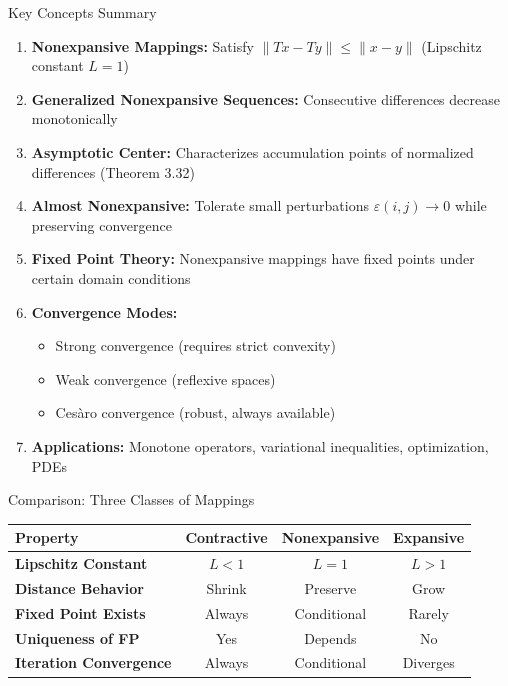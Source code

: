 \documentclass[aspectratio=169,10pt]{beamer}
\begin{document}
\begin{frame}{Key Concepts Summary}
    \begin{enumerate}
        \item \textbf{Nonexpansive Mappings:} Satisfy $\|Tx - Ty\| \leq \|x - y\|$ (Lipschitz constant $L = 1$)

        \item \textbf{Generalized Nonexpansive Sequences:} Consecutive differences decrease monotonically

        \item \textbf{Asymptotic Center:} Characterizes accumulation points of normalized differences (Theorem 3.32)

        \item \textbf{Almost Nonexpansive:} Tolerate small perturbations $\varepsilon(i,j) \to 0$ while preserving convergence

        \item \textbf{Fixed Point Theory:} Nonexpansive mappings have fixed points under certain domain conditions

        \item \textbf{Convergence Modes:}
            \begin{itemize}
                \item Strong convergence (requires strict convexity)
                \item Weak convergence (reflexive spaces)
                \item Cesàro convergence (robust, always available)
            \end{itemize}

        \item \textbf{Applications:} Monotone operators, variational inequalities, optimization, PDEs
    \end{enumerate}
\end{frame}

\begin{frame}{Comparison: Three Classes of Mappings}
    \centering
    \begin{tabular}{|l|c|c|c|}
        \hline
        \textbf{Property} & \textbf{Contractive} & \textbf{Nonexpansive} & \textbf{Expansive} \\
        \hline
        \textbf{Lipschitz Constant} & $L < 1$ & $L = 1$ & $L > 1$ \\
        \hline
        \textbf{Distance Behavior} & Shrink & Preserve & Grow \\
        \hline
        \textbf{Fixed Point Exists} & Always & Conditional & Rarely \\
        \hline
        \textbf{Uniqueness of FP} & Yes & Depends & No \\
        \hline
        \textbf{Iteration Convergence} & Always & Conditional & Diverges \\
        \hline
    \end{tabular}
\end{frame}
\end{document}
